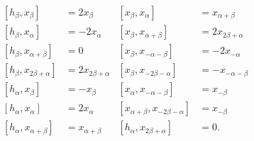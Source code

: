 \documentclass[10pt]{article}
\begin{document}
$$
\begin{array}{llll}
{\left[h_{\beta}, x_{\beta}\right]} & =2 x_{\beta} & {\left[x_{\beta}, x_{\alpha}\right]} & =x_{\alpha+\beta} \\
{\left[h_{\beta}, x_{\alpha}\right]} & =-2 x_{\alpha} & {\left[x_{\beta}, x_{\alpha+\beta}\right]} & =2 x_{2 \beta+\alpha} \\
{\left[h_{\beta}, x_{\alpha+\beta}\right]} & =0 & {\left[x_{\beta}, x_{-\alpha-\beta}\right]} & =-2 x_{-\alpha} \\
{\left[h_{\beta}, x_{2 \beta+\alpha}\right]} & =2 x_{2 \beta+\alpha} & {\left[x_{\beta}, x_{-2 \beta-\alpha}\right]} & =-x_{-\alpha-\beta} \\
{\left[h_{\alpha}, x_{\beta}\right]} & =-x_{\beta} & {\left[x_{\alpha}, x_{-\alpha-\beta}\right]} & =x_{-\beta} \\
{\left[h_{\alpha}, x_{\alpha}\right]} & =2 x_{\alpha} & {\left[x_{\alpha+\beta}, x_{-2 \beta-\alpha}\right]} & =x_{-\beta} \\
{\left[h_{\alpha}, x_{\alpha+\beta}\right]} & =x_{\alpha+\beta} & {\left[h_{\alpha}, x_{2 \beta+\alpha}\right]} & =0 .
\end{array}
$$
\end{document}
